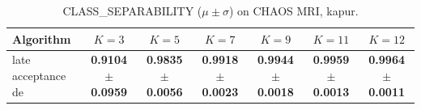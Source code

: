 \begin{table}[htbp]
\centering
\caption{CLASS_SEPARABILITY ($\mu \pm \sigma$) on CHAOS MRI, kapur.}
\label{tab:exp2-kapur-class_separability}
\begin{tabular}{lcccccc}
\toprule
Algorithm & $K=3$ & $K=5$ & $K=7$ & $K=9$ & $K=11$ & $K=12$ \\
\midrule
late acceptance de & \textbf{0.9104 $\pm$ 0.0959} & \textbf{0.9835 $\pm$ 0.0056} & \textbf{0.9918 $\pm$ 0.0023} & \textbf{0.9944 $\pm$ 0.0018} & \textbf{0.9959 $\pm$ 0.0013} & \textbf{0.9964 $\pm$ 0.0011} \\
\bottomrule
\end{tabular}
\end{table}